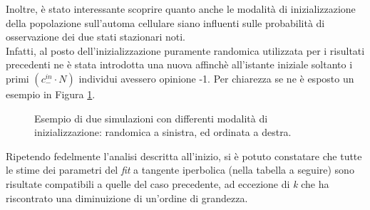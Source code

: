 \documentclass[letterpaper,10pt]{article}
\begin{document}
Inoltre, è stato interessante scoprire quanto anche le modalità di inizializzazione della popolazione sull'automa cellulare siano influenti sulle probabilità di osservazione dei due stati stazionari noti.
\\ Infatti, al posto dell'inizializzazione puramente randomica utilizzata per i risultati precedenti ne è stata introdotta una nuova affinchè all'istante iniziale soltanto i primi $(c_{-}^{in} \cdot N)$ individui avessero opinione -1. Per chiarezza se ne è esposto un esempio in Figura \ref{Fig:12}.

\begin{figure}[h]
{\centering\par
{}
\par}
\caption{Esempio di due simulazioni con differenti modalità di inizializzazione: randomica a sinistra, ed ordinata a destra.}
\label{Fig:12}
\end{figure}
\medskip

Ripetendo fedelmente l'analisi descritta all'inizio, si è potuto constatare che tutte le stime dei parametri del \textit{fit} a tangente iperbolica (nella tabella a seguire) sono risultate compatibili a quelle del caso precedente, ad eccezione di \textit{k} che ha riscontrato una diminuizione di un'ordine di grandezza.
\end{document}
